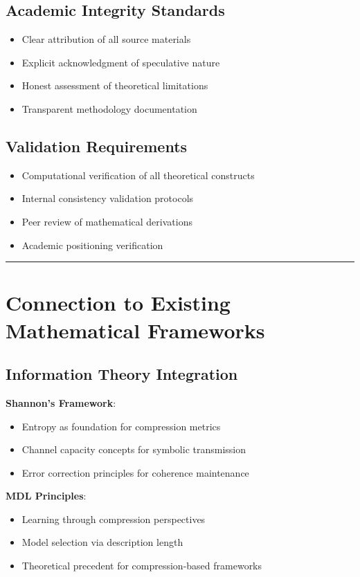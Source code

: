 \subsection{Academic Integrity Standards}
\begin{itemize}
\item Clear attribution of all source materials
\item Explicit acknowledgment of speculative nature
\item Honest assessment of theoretical limitations
\item Transparent methodology documentation
\end{itemize}

\subsection{Validation Requirements}
\begin{itemize}
\item Computational verification of all theoretical constructs
\item Internal consistency validation protocols
\item Peer review of mathematical derivations
\item Academic positioning verification
\end{itemize}

\hrule

\section{Connection to Existing Mathematical Frameworks}

\subsection{Information Theory Integration}
\textbf{Shannon's Framework}: 
\begin{itemize}
\item Entropy as foundation for compression metrics
\item Channel capacity concepts for symbolic transmission
\item Error correction principles for coherence maintenance
\end{itemize}

\textbf{MDL Principles}:
\begin{itemize}
\item Learning through compression perspectives
\item Model selection via description length
\item Theoretical precedent for compression-based frameworks
\end{itemize}

